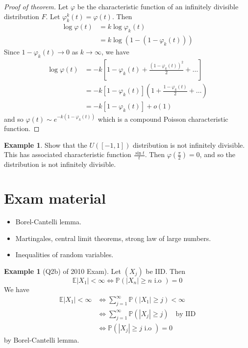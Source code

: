 \documentclass[10pt, oneside, reqno]{amsart}
\theoremstyle{plain}%
\theoremstyle{definition}
\newtheorem{exmp}[thm]{Example}
\theoremstyle{remark}
\renewcommand{\phi}{\varphi}
\newcommand{\E}{\mathbb{E}}
\renewcommand{\P}{\mathbb{P}}
\begin{document}
\begin{proof}[Proof of theorem]
	Let $\phi$ be the characteristic function of an infinitely divisible distribution $F$.  Let $\phi_k^k(t) = \phi(t)$.  Then \begin{align*}
		\log \phi(t) 	&= k \log \phi_k(t) \\
						&= k \log ( 1 - (1 - \phi_k(t))) 
	\end{align*}
  Since $ 1 - \phi_k(t) \rightarrow 0$ as $ k \rightarrow \infty$, we have \begin{align*}
		\log \phi(t) &= -k [ 1 - \phi_k(t) + \frac{\left( 1 - \phi_k(t) \right)^2}{2} + \dots] \\
			&= - k[1 - \phi_k(t)]( 1 + \frac{1 - \phi_k(t)}{2} + \dots) \\
			&=  - k[1 - \phi_k(t)] + o(1)
	\end{align*} and so $\phi(t) \sim e^{-k( 1 - \phi_k(t))}$ which is a compound Poisson characteristic function. 
\end{proof}

\begin{exmp}
	Show that the $U([-1, 1])$ distribution is not infinitely divisible.  This has associated characteristic function $\frac{\sin t}{t}$.  Then $\phi(\frac{\pi}{2}) = 0$, and so the distribution is not infinitely divisible.
\end{exmp}

\section{Exam material} %
\label{sec:exam_material}
\begin{itemize}
	\item Borel-Cantelli lemma.
	\item Martingales, central limit theorems, strong law of large numbers.
	\item Inequalities of random variables.
\end{itemize}

\begin{exmp}[Q2b) of 2010 Exam]
	Let $(X_j)$ be IID.  Then \[
		\E|X_1| < \infty \iff \P(|X_n| \geq n \text{ i.o }) = 0 
	\]  We have \begin{align*}
		\E|X_1| < \infty &\iff \sum_{j=1}^\infty \P(|X_1| \geq j) < \infty \\
				&\iff \sum_{j=1}^\infty \P(|X_j| \geq j) \quad \text{by IID} \\
				&\iff \P(|X_j| \geq j \text{ i.o }) = 0
	\end{align*} by Borel-Cantelli lemma.
\end{exmp}
\end{document}
